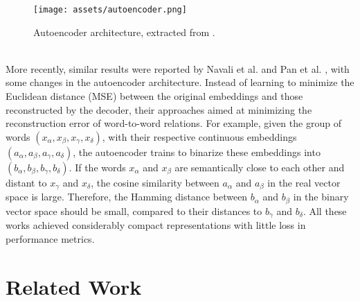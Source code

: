 \documentclass[11pt,titlepage,oneside,openany]{book}
\begin{document}
\begin{figure}[h!]
    \centering
    \centerline{\texttt{[image: assets/autoencoder.png]}}
    \caption{Autoencoder architecture, extracted from \cite{tissier_near-lossless_2019}.}
    \label{fig:autoencoder}
\end{figure}
\\
More recently, similar results were reported by Navali et al. \cite{navali_word_2020} and Pan et al. \cite{pan_relation_2021}, with some changes in the autoencoder architecture. Instead of learning to minimize the Euclidean distance (MSE) between the original embeddings and those reconstructed by the decoder, their approaches aimed at minimizing the reconstruction error of word-to-word relations. For example, given the group of words $(x_\alpha, x_\beta, x_\gamma, x_\delta)$, with their respective continuous embeddings $(a_\alpha, a_\beta, a_\gamma, a_\delta)$, the autoencoder trains to binarize these embeddings into $(b_\alpha, b_\beta, b_\gamma, b_\delta)$. If the words $x_\alpha$ and $x_\beta$ are semantically close to each other and distant to $x_\gamma$ and $x_\delta$, the cosine similarity between $a_\alpha$ and $a_\beta$ in the real vector space is large. Therefore, the Hamming distance between $b_\alpha$ and $b_\beta$ in the binary vector space should be small, compared to their distances to $b_\gamma$ and $b_\delta$. All these works achieved considerably compact representations with little loss in performance metrics.


\section{Related Work}
\label{sec:rel-work}
\end{document}
